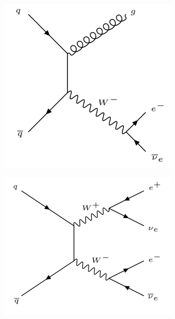 \documentclass{article}
\begin{document}
\begin{figure}[htb]
    \centering
    \begin{subfigure}{.25\textwidth}
        \includegraphics[height=\textwidth]{images/W_jets.png}
        \caption{}
        \label{fig:bckgFeynman_wJets}
    \end{subfigure}
    \begin{subfigure}{.25\textwidth}
        \includegraphics[height=\textwidth]{images/WW.png}

\end{subfigure}
\end{figure}
\end{document}
